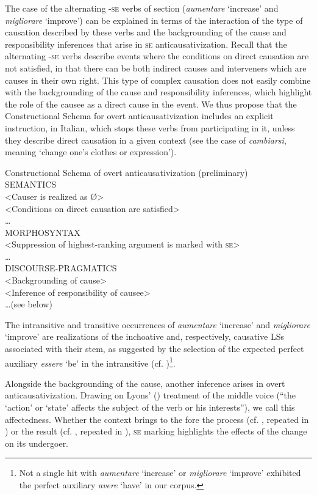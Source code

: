 \documentclass[output=paper,colorlinks,citecolor=brown
]{langscibook}
\begin{document}
The case of the alternating -\textsc{se} verbs of section  (\textit{aumentare} ‘increase’ and \textit{migliorare} ‘improve’) can be explained in terms of the interaction of the type of causation described by these verbs and the backgrounding of the cause and responsibility inferences that arise in \textsc{se} anticausativization. Recall that the alternating -\textsc{se} verbs describe events where the conditions on direct causation are not satisfied, in that there can be both indirect causes and interveners which are causes in their own right. This type of complex causation does not easily combine with the backgrounding of the cause and responsibility inferences, which highlight the role of the causee as a direct cause in the event. We thus propose that the Constructional Schema for overt anticausativization includes an explicit instruction, in Italian, which stops these verbs from participating in it, unless they describe direct causation in a given context (see the case of \textit{cambiarsi}, meaning ‘change one’s clothes or expression’).

\ea \label{bentley_example_54}
Constructional Schema of overt anticausativization (preliminary)\\
SEMANTICS\\
<Causer is realized as Ø>\\
<Conditions on direct causation are satisfied>\\
 \ldots \\
MORPHOSYNTAX\\
<Suppression of highest-ranking argument is marked with \textsc{se}>\\
 \ldots \\
DISCOURSE-PRAGMATICS\\
<Backgrounding of cause>\\
<Inference of responsibility of causee>\\
 \ldots  (see below)
\z

The intransitive and transitive occurrences of \textit{aumentare} ‘increase’ and \textit{migliorare} ‘improve’ are realizations of the inchoative and, respectively, causative LSs associated with their stem, as suggested by the selection of the expected perfect auxiliary \textit{essere} ‘be’ in the intransitive (cf. )\footnote{Not a single hit with \textit{aumentare} ‘increase’ or \textit{migliorare} ‘improve’ exhibited the perfect auxiliary \textit{avere} ‘have’ in our corpus.}. 

Alongside the backgrounding of the cause, another inference arises in overt anticausativization. Drawing on Lyons’ (\citeyear[373]{lyons1969introduction}) treatment of the middle voice (“the ‘action’ or ‘state’ affects the subject of the verb or his interests”), we call this affectedness. Whether the context brings to the fore the process (cf. , repeated in ) or the result (cf. , repeated in ), \textsc{se} marking highlights the effects of the change on its undergoer. 
\end{document}
